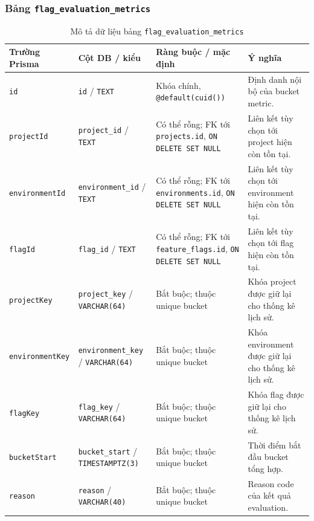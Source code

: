 \subsubsection{Bảng \texttt{flag\_evaluation\_metrics}}

\begin{table}[H]
    \centering
    \caption{Mô tả dữ liệu bảng \texttt{flag\_evaluation\_metrics}}
    \label{tab:db-flag-evaluation-metrics}
    \begingroup
    \singlespacing
    \scriptsize
    \setlength{\tabcolsep}{3pt}
    \renewcommand{\arraystretch}{1.12}
    \begin{tabular}{p{} p{} p{} p{}}
        \toprule
        \textbf{Trường Prisma} & \textbf{Cột DB / kiểu} & \textbf{Ràng buộc / mặc định} & \textbf{Ý nghĩa} \\
        \midrule
        \texttt{id} & \texttt{id} / \texttt{TEXT} & Khóa chính, \texttt{@default(cuid())} & Định danh nội bộ của bucket metric. \\
        \texttt{projectId} & \texttt{project\_id} / \texttt{TEXT} & Có thể rỗng; FK tới \texttt{projects.id}, \texttt{ON DELETE SET NULL} & Liên kết tùy chọn tới project hiện còn tồn tại. \\
        \texttt{environmentId} & \texttt{environment\_id} / \texttt{TEXT} & Có thể rỗng; FK tới \texttt{environments.id}, \texttt{ON DELETE SET NULL} & Liên kết tùy chọn tới environment hiện còn tồn tại. \\
        \texttt{flagId} & \texttt{flag\_id} / \texttt{TEXT} & Có thể rỗng; FK tới \texttt{feature\_flags.id}, \texttt{ON DELETE SET NULL} & Liên kết tùy chọn tới flag hiện còn tồn tại. \\
        \texttt{projectKey} & \texttt{project\_key} / \texttt{VARCHAR(64)} & Bắt buộc; thuộc unique bucket & Khóa project được giữ lại cho thống kê lịch sử. \\
        \texttt{environmentKey} & \texttt{environment\_key} / \texttt{VARCHAR(64)} & Bắt buộc; thuộc unique bucket & Khóa environment được giữ lại cho thống kê lịch sử. \\
        \texttt{flagKey} & \texttt{flag\_key} / \texttt{VARCHAR(64)} & Bắt buộc; thuộc unique bucket & Khóa flag được giữ lại cho thống kê lịch sử. \\
        \texttt{bucketStart} & \texttt{bucket\_start} / \texttt{TIMESTAMPTZ(3)} & Bắt buộc; thuộc unique bucket & Thời điểm bắt đầu bucket tổng hợp. \\
        \texttt{reason} & \texttt{reason} / \texttt{VARCHAR(40)} & Bắt buộc; thuộc unique bucket & Reason code của kết quả evaluation. \\

\end{tabular}
\end{table}
